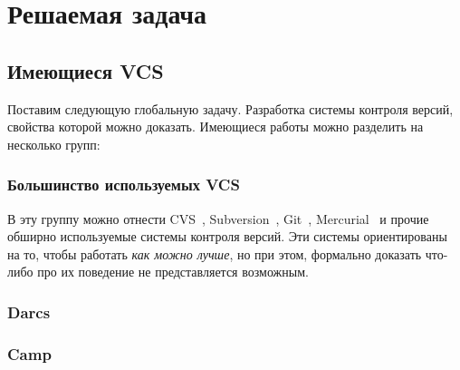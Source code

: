 \section{Решаемая задача}

\subsection{Имеющиеся VCS}

Поставим следующую глобальную задачу. Разработка системы контроля
версий, свойства которой можно доказать. Имеющиеся работы можно
разделить на несколько групп:

\subsubsection{Большинство используемых VCS}

В эту группу можно отнести CVS~\cite{cvs}, Subversion~\cite{svnbook},
Git~\cite{progit}, Mercurial~\cite{mercurial} %
и прочие обширно используемые системы контроля версий. Эти системы
ориентированы на то, чтобы работать \emph{как можно лучше}, но при
этом, формально доказать что-либо про их поведение не представляется
возможным. 

\subsubsection{Darcs}

\subsubsection{Camp}

